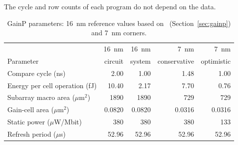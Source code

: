 \documentclass[preprint,review,12pt]{elsarticle}
\newcommand{\gainp}{GainP}
\newcommand{\hyp}[1]{#1}   %
\begin{document}
The cycle and row counts of each program do not depend on the data.

\begin{table}[!htbp]
\small
\centering
\caption{\gainp{} parameters: 16~nm reference values based on~\cite{levi2026gainp} (Section~\ref{sec:gainp}) and 7~nm corners.}
\label{tab:params7}
\begin{tabular}{lrrrr}
\toprule
 & 16~nm & 16~nm & 7~nm & 7~nm \\
Parameter & circuit & system & conservative & optimistic \\
\midrule
Compare cycle (ns) & 2.00 & 1.00 & \hyp{1.48} & \hyp{1.00} \\
Energy per cell operation (fJ) & 10.40 & \hyp{2.17} & \hyp{7.70} & \hyp{0.76} \\
Subarray macro area ($\mu$m$^2$) & 1890 & 1890 & \hyp{729} & \hyp{729} \\
Gain-cell area ($\mu$m$^2$) & 0.0820 & 0.0820 & \hyp{0.0316} & \hyp{0.0316} \\
Static power ($\mu$W/Mbit) & \hyp{380} & \hyp{380} & \hyp{380} & \hyp{133} \\
Refresh period ($\mu$s) & \hyp{52.96} & \hyp{52.96} & \hyp{52.96} & \hyp{52.96} \\
\bottomrule
\end{tabular}
\end{table}
\end{document}
